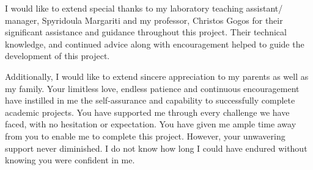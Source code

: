 \begin{acknowledgements}
I would like to extend special thanks to my laboratory teaching assistant/ manager, Spyridoula Margariti and my professor, Christos Gogos for their significant assistance and guidance throughout this project. Their technical knowledge, and continued advice along with encouragement helped to guide the development of this project.

Additionally, I would like to extend sincere appreciation to my parents as well as my family. Your limitless love, endless patience and continuous encouragement have instilled in me the self-assurance and capability to successfully complete academic projects. You have supported me through every challenge we have faced, with no hesitation or expectation. You have given me ample time away from you to enable me to complete this project. However, your unwavering support never diminished. I do not know how long I could have endured without knowing you were confident in me.
\end{acknowledgements}